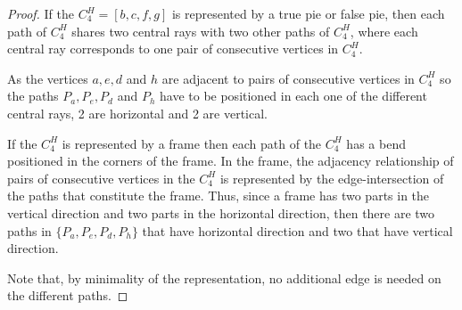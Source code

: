 \documentclass[
submission
]{dmtcs-episciences}
\begin{document}



\begin{proof}
If the $C_4^{H} = [b,c,f,g]$ is  represented by a true pie or false pie, then each path of $C_4^{H}$ shares two central rays with two other paths of $C_4^{H}$, where each central ray corresponds to one pair of consecutive vertices in $C_4^{H}$.

As the vertices $a, e, d $ and $ h$ are adjacent to pairs of consecutive vertices in $C_4^{H}$ so the paths $P_{a}, P_{e}, P_{d}$ and $P_{h}$ have to be positioned in each one of the different central rays,  2 are horizontal  and 2 are vertical.

If the $C_4^{H}$ is  represented by a frame then each path of the $C_4^{H}$ has a bend positioned in  the corners of the frame. In the frame, the adjacency relationship of pairs of consecutive vertices in the $C_4^{H}$ is represented by the edge-intersection of the paths that constitute the frame. Thus, since a frame has two parts in the vertical direction and two parts in the horizontal direction, then there are two paths in $\{P_{a}, P_{e}, P_{d}, P_{h}\}$ that have horizontal direction and two that have vertical direction.

Note that, by minimality of the representation, no additional edge is needed on the different paths.
 \end{proof}
\end{document}
